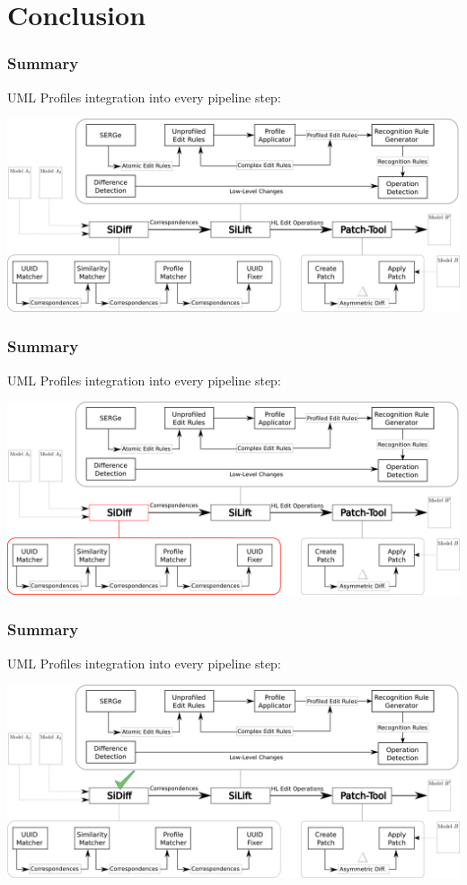 \documentclass[10pt]{beamer}
\begin{document}
\section{Conclusion}
\begin{frame}
\frametitle{Summary}
UML Profiles integration into every pipeline step:
\begin{center}
\includegraphics[scale=0.375]{integration_overview_ready}\\
\end{center}
\end{frame}
\begin{frame}
\frametitle{Summary}
UML Profiles integration into every pipeline step:
\begin{center}
\includegraphics[scale=0.375]{integration_overview_ready_p1}\\
\end{center}

\end{frame}
\begin{frame}
\frametitle{Summary}
UML Profiles integration into every pipeline step:
\begin{center}
\includegraphics[scale=0.375]{integration_overview_ready_p2}\\
\end{center}
\end{frame}
\end{document}
